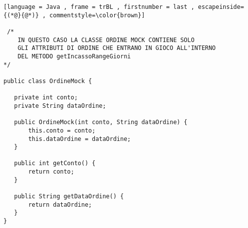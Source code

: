 \begin{lstlisting}[language = Java , frame = trBL , firstnumber = last , escapeinside={(*@}{@*)} , commentstyle=\color{brown}]
   
 /*
    IN QUESTO CASO LA CLASSE ORDINE MOCK CONTIENE SOLO
    GLI ATTRIBUTI DI ORDINE CHE ENTRANO IN GIOCO ALL'INTERNO
    DEL METODO getIncassoRangeGiorni
*/

public class OrdineMock {

   private int conto;
   private String dataOrdine;

   public OrdineMock(int conto, String dataOrdine) {
       this.conto = conto;
       this.dataOrdine = dataOrdine;
   }

   public int getConto() {
       return conto;
   }

   public String getDataOrdine() {
       return dataOrdine;
   }
}

\end{lstlisting}
\vspace{0.2cm}
    
